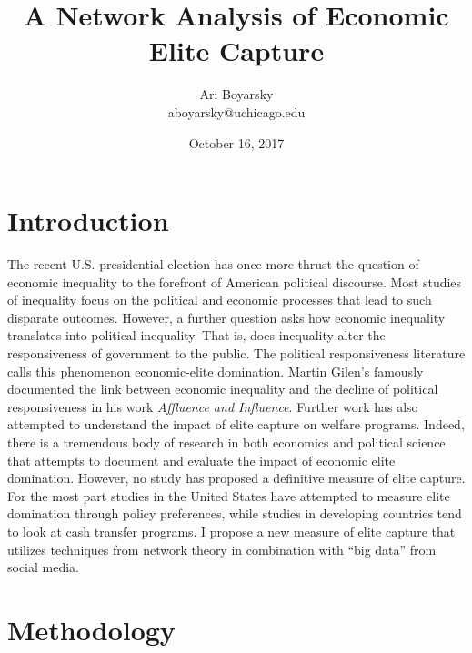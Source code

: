 \documentclass[dvips,12pt]{article}
\begin{document}


\title{A Network Analysis of Economic Elite Capture}
\author{Ari Boyarsky \\ aboyarsky@uchicago.edu}
\date{October 16, 2017}




\maketitle


\section{Introduction}

\indent The recent U.S. presidential election has once more thrust the question of economic inequality to the forefront of American political discourse. Most studies of inequality focus on the political and economic processes that lead to such disparate outcomes. However, a further question asks how economic inequality translates into political inequality. That is, does inequality alter the responsiveness of government to the public. The political responsiveness literature calls this phenomenon economic-elite domination.\cite{RefWorks:doc:59e2928ee4b07e3b24389b4d} Martin Gilen’s famously documented the link between economic inequality and the decline of political responsiveness in his work \textit{Affluence and Influence}.\cite{RefWorks:doc:59e2931fe4b0b4635e033b19} Further work has also attempted to understand the impact of elite capture on welfare programs.\cite{RefWorks:doc:59e29357e4b0b4635e033b1f} Indeed, there is a tremendous body of research in both economics and political science that attempts to document and evaluate the impact of economic elite domination. However, no study has proposed a definitive measure of elite capture. For the most part studies in the United States have attempted to measure elite domination through policy preferences, while studies in developing countries tend to look at cash transfer programs. I propose a new measure of elite capture that utilizes techniques from network theory in combination with “big data” from social media. 



\section{Methodology}
\end{document}
